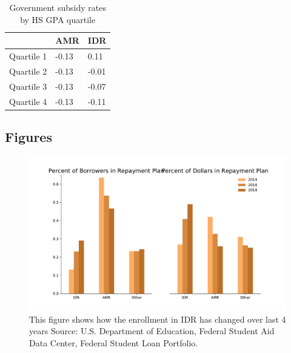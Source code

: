   \begin{table}[H]
    \begin{tabular}{lll}
      \toprule
      & \textbf{AMR} & \textbf{IDR} \\
      \midrule
      Quartile 1 & -0.13 & 0.11 \\
      Quartile 2 & -0.13 & -0.01 \\
      Quartile 3 & -0.13 & -0.07 \\
      Quartile 4 & -0.13 & -0.11 \\
      \bottomrule
    \end{tabular}
    \caption{Government subsidy rates by HS GPA quartile}
    \label{table:subsidy_gpa}
  \end{table}

\clearpage
\newpage

%
%
\subsection{Figures}

  \begin{center}
    \begin{figure}[H]
      \includegraphics[width=\textwidth]{images/StudentLoans/idr_enrollment_ts.pdf}
      \caption{
        This figure shows how the enrollment in IDR has changed over last 4 years
        \tiny{Source: U.S. Department of Education, Federal Student Aid Data Center, Federal Student Loan Portfolio.}
      }
      \label{fig:idr_enrollment}
    \end{figure}
  \end{center}

